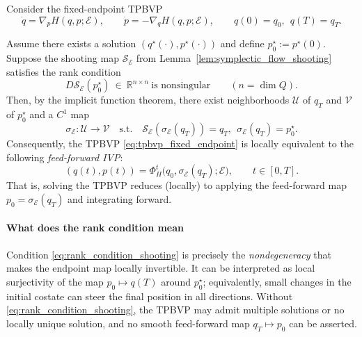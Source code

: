 \begin{proposition}
\label{prop:tpbvp_feedforward_by_ift}
Consider the fixed-endpoint TPBVP
\begin{equation}
\label{eq:tpbvp_fixed_endpoint}
\dot q=\nabla_p H(q,p;\mathcal E),\qquad
\dot p=-\nabla_q H(q,p;\mathcal E),\qquad
q(0)=q_0,\ \ q(T)=q_T.
\end{equation}




Assume there exists a solution $(q^\star(\cdot),p^\star(\cdot))$ and define $p_0^\star:=p^\star(0)$.
Suppose the shooting map $\mathcal S_{\mathcal E}$ from Lemma~\ref{lem:symplectic_flow_shooting} satisfies the rank condition
\begin{equation}
\label{eq:rank_condition_shooting}
D\mathcal S_{\mathcal E}(p_0^\star)\ \in\ \mathbb R^{n\times n}\ \text{is nonsingular}\qquad (n=\dim Q).
\end{equation}
Then, by the implicit function theorem, there exist neighborhoods $\mathcal U$ of $q_T$ and $\mathcal V$ of $p_0^\star$
and a $C^1$ map
\[
\sigma_{\mathcal E}:\mathcal U\to \mathcal V
\quad\text{s.t.}\quad
\mathcal S_{\mathcal E}(\sigma_{\mathcal E}(q_T))=q_T,\ \ \sigma_{\mathcal E}(q_T)=p_0^\star.
\]
Consequently, the TPBVP \cref{eq:tpbvp_fixed_endpoint} is locally equivalent to the following \emph{feed-forward IVP}:
\[
(q(t),p(t))=\Phi_H^{t}\big(q_0,\sigma_{\mathcal E}(q_T);\mathcal E\big),\qquad t\in[0,T].
\]
That is, solving the TPBVP reduces (locally) to applying the feed-forward map $p_0=\sigma_{\mathcal E}(q_T)$ and integrating forward.
\end{proposition}

\paragraph{What does the rank condition mean}
Condition \eqref{eq:rank_condition_shooting} is precisely the \emph{nondegeneracy} that makes the endpoint map locally invertible.
It can be interpreted as local surjectivity of the map $p_0\mapsto q(T)$ around $p_0^\star$; equivalently,
small changes in the initial costate can steer the final position in all directions.
Without \eqref{eq:rank_condition_shooting}, the TPBVP may admit multiple solutions or no locally unique solution, and no smooth
feed-forward map $q_T\mapsto p_0$ can be asserted.


